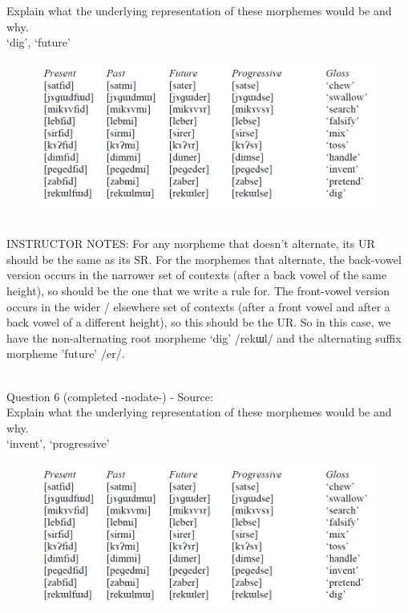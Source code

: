 \documentclass[12pt]{article}
\begin{document}
Explain what the underlying representation of these morphemes would be and why.\\

`dig', `future'

\begin{figure}[H]
\includegraphics{../images/final_dataset.png}
\end{figure}

~\\
INSTRUCTOR NOTES: For any morpheme that doesn’t alternate, its UR should be the same as its SR.  For the morphemes that alternate, the back-vowel version occurs in the narrower set of contexts (after a back vowel of the same height), so should be the one that we write a rule for. The front-vowel version occurs in the wider / elsewhere set of contexts (after a front vowel and after a back vowel of a different height), so this should be the UR. So in this case, we have the non-alternating root morpheme ‘dig’ /rekɯl/ and the alternating suffix morpheme 'future' /er/.


~\\

{\large Question 6} (completed -nodate-) - Source: \\

Explain what the underlying representation of these morphemes would be and why.\\

`invent', `progressive'

\begin{figure}[H]
\includegraphics{../images/final_dataset.png}
\end{figure}
\end{document}
